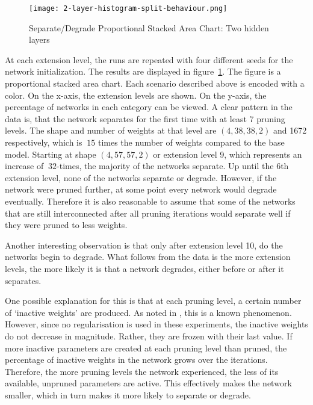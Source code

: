 \begin{figure}[ht]
    \centering
    \texttt{[image: 2-layer-histogram-split-behaviour.png]}
    \caption{
        Separate/Degrade Proportional Stacked Area Chart: Two hidden layers
        }\label{fig:2laxer-histogram}
\end{figure}

At each extension level, the runs are repeated with four different seeds for the network initialization.
The results are displayed in figure~\ref{fig:2laxer-histogram}.
The figure is a proportional stacked area chart.
Each scenario described above is encoded with a color.
On the x-axis, the extension levels are shown.
On the y-axis, the percentage of networks in each category can be viewed.
A clear pattern in the data is, that the network separates for the first time with at least 7 pruning levels.
The shape and number of weights at that level are $(4,38,38,2)$ and 1672 respectively, which is $~15$ times the number of weights compared to the base model. 
Starting at shape $(4,57,57,2)$ or extension level 9, which represents an increase of $~32$-times, the majority of the networks separate.
Up until the 6th extension level, none of the networks separate or degrade. 
However, if the network were pruned further, at some point every network would degrade eventually.
Therefore it is also reasonable to assume that some of the networks that are still interconnected after all pruning iterations would separate well if they were pruned to less weights.

Another interesting observation is that only after extension level 10, do the networks begin to degrade.
What follows from the data is the more extension levels, the more likely it is that a network degrades, either before or after it separates.

One possible explanation for this is that at each pruning level, a certain number of `inactive weights' are produced.
As noted in \autocite{HanEtAl15, AllAlivePruning}, this is a known phenomenon.
However, since no regularisation is used in these experiments, the inactive weights do not decrease in magnitude.
Rather, they are frozen with their last value.
If more inactive parameters are created at each pruning level than pruned, the percentage of inactive weights in the network grows over the iterations.
Therefore, the more pruning levels the network experienced, the less of its available, unpruned parameters are active.
This effectively makes the network smaller, which in turn makes it more likely to separate or degrade.

